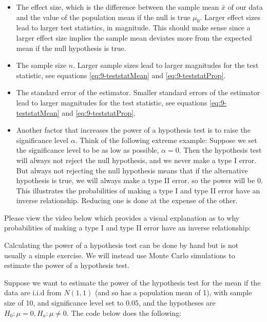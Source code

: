 \documentclass[
]{book}
\begin{document}
\begin{itemize}
\item
  The effect size, which is the difference between the sample mean \(\bar{x}\) of our data and the value of the population mean if the null is true \(\mu_0\). Larger effect sizes lead to larger test statistics, in magnitude. This should make sense since a larger effect size implies the sample mean deviates more from the expected mean if the null hypothesis is true.
\item
  The sample size \(n\). Larger sample sizes lead to larger magnitudes for the test statistic, see equations \eqref{eq:9-teststatMean} and \eqref{eq:9-teststatProp}.
\item
  The standard error of the estimator. Smaller standard errors of the estimator lead to larger magnitudes for the test statistic, see equations \eqref{eq:9-teststatMean} and \eqref{eq:9-teststatProp}.
\item
  Another factor that increases the power of a hypothesis test is to raise the significance level \(\alpha\). Think of the following extreme example: Suppose we set the significance level to be as low as possible, \(\alpha=0\). Then the hypothesis test will always not reject the null hypothesis, and we never make a type I error. But always not rejecting the null hypothesis means that if the alternative hypothesis is true, we will always make a type II error, so the power will be 0. This illustrates the probabilities of making a type I and type II error have an inverse relationship. Reducing one is done at the expense of the other.
\end{itemize}

Please view the video below which provides a visual explanation as to why probabilities of making a type I and type II error have an inverse relationship:

Calculating the power of a hypothesis test can be done by hand but is not usually a simple exercise. We will instead use Monte Carlo simulations to estimate the power of a hypothesis test.

Suppose we want to estimate the power of the hypothesis test for the mean if the data are i.i.d from \(N(1,1)\) (and so has a population mean of 1), with sample size of 10, and significance level set to 0.05, and the hypotheses are \(H_0: \mu = 0, H_a: \mu \neq 0\). The code below does the following:
\end{document}
